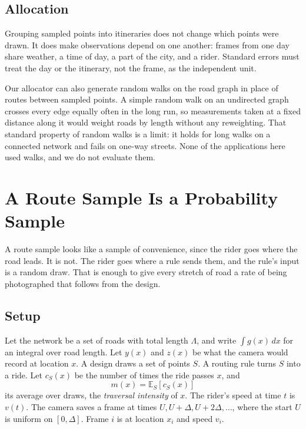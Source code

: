 \documentclass[11pt]{article}
\begin{document}
\subsection{Allocation}

Grouping sampled points into itineraries does not change which points were drawn. It does make observations depend on one another: frames from one day share weather, a time of day, a part of the city, and a rider. Standard errors must treat the day or the itinerary, not the frame, as the independent unit.

Our allocator can also generate random walks on the road graph in place of routes between sampled points. A simple random walk on an undirected graph crosses every edge equally often in the long run, so measurements taken at a fixed distance along it would weight roads by length without any reweighting. That standard property of random walks is a limit: it holds for long walks on a connected network and fails on one-way streets. None of the applications here used walks, and we do not evaluate them.

\section{A Route Sample Is a Probability Sample}
\label{sec:route}

A route sample looks like a sample of convenience, since the rider goes where the road leads. It is not. The rider goes where a rule sends them, and the rule's input is a random draw. That is enough to give every stretch of road a rate of being photographed that follows from the design.

\subsection{Setup}

Let the network be a set of roads with total length $\Lambda$, and write $\int g(x)\,dx$ for an integral over road length. Let $y(x)$ and $z(x)$ be what the camera would record at location $x$. A design draws a set of points $S$. A routing rule turns $S$ into a ride. Let $c_S(x)$ be the number of times the ride passes $x$, and
\begin{equation}
    m(x) = \mathbb{E}_S\left[c_S(x)\right]
\end{equation}
its average over draws, the \emph{traversal intensity} of $x$. The rider's speed at time $t$ is $v(t)$. The camera saves a frame at times $U, U + \Delta, U + 2\Delta, \ldots$, where the start $U$ is uniform on $[0, \Delta]$. Frame $i$ is at location $x_i$ and speed $v_i$.
\end{document}
